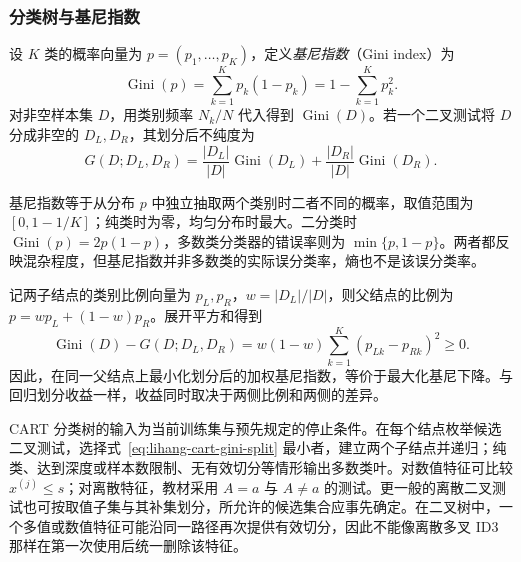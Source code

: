 \subsubsection{分类树与基尼指数}

\begin{definition}[基尼指数]
设 $K$ 类的概率向量为 $p=(p_1,\ldots,p_K)$，定义\emph{基尼指数}（Gini index）为
\begin{equation}
  \operatorname{Gini}(p)=\sum_{k=1}^Kp_k(1-p_k)
  =1-\sum_{k=1}^Kp_k^2.
  \label{eq:lihang-gini}
\end{equation}
对非空样本集 $D$，用类别频率 $N_k/N$ 代入得到 $\operatorname{Gini}(D)$。若一个二叉测试将 $D$ 分成非空的 $D_L,D_R$，其划分后不纯度为
\begin{equation}
  G(D;D_L,D_R)=\frac{|D_L|}{|D|}\operatorname{Gini}(D_L)
  +\frac{|D_R|}{|D|}\operatorname{Gini}(D_R).
  \label{eq:lihang-cart-gini-split}
\end{equation}
\end{definition}

基尼指数等于从分布 $p$ 中独立抽取两个类别时二者不同的概率，取值范围为 $[0,1-1/K]$；纯类时为零，均匀分布时最大。二分类时 $\operatorname{Gini}(p)=2p(1-p)$，多数类分类器的错误率则为 $\min\{p,1-p\}$。两者都反映混杂程度，但基尼指数并非多数类的实际误分类率，熵也不是该误分类率。

记两子结点的类别比例向量为 $p_L,p_R$，$w=|D_L|/|D|$，则父结点的比例为 $p=wp_L+(1-w)p_R$。展开平方和得到
\begin{equation}
  \operatorname{Gini}(D)-G(D;D_L,D_R)
  =w(1-w)\sum_{k=1}^K(p_{Lk}-p_{Rk})^2\geq0.
  \label{eq:lihang-cart-gini-gain}
\end{equation}
因此，在同一父结点上最小化划分后的加权基尼指数，等价于最大化基尼下降。与回归划分收益一样，收益同时取决于两侧比例和两侧的差异。

CART 分类树的输入为当前训练集与预先规定的停止条件。在每个结点枚举候选二叉测试，选择式~\eqref{eq:lihang-cart-gini-split} 最小者，建立两个子结点并递归；纯类、达到深度或样本数限制、无有效切分等情形输出多数类叶。对数值特征可比较 $x^{(j)}\leq s$；对离散特征，教材采用 $A=a$ 与 $A\ne a$ 的测试。更一般的离散二叉测试也可按取值子集与其补集划分，所允许的候选集合应事先确定。在二叉树中，一个多值或数值特征可能沿同一路径再次提供有效切分，因此不能像离散多叉 ID3 那样在第一次使用后统一删除该特征。

